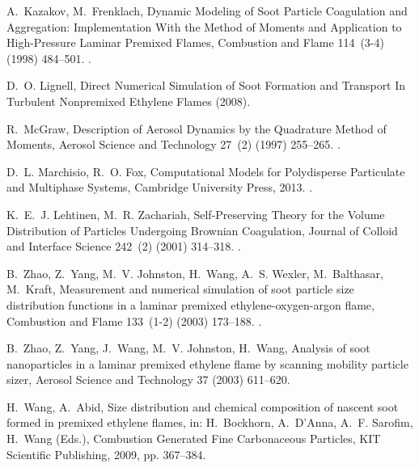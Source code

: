 \documentclass[preprint,letterpaper]{elsarticle}
\begin{document}
\begin{thebibliography}{00}
A.~Kazakov, M.~Frenklach, {Dynamic Modeling of Soot Particle Coagulation and
Aggregation: Implementation With the Method of Moments and Application to
High-Pressure Laminar Premixed Flames}, {Combustion and Flame} 114~(3-4)
(1998) 484--501.
\newblock \href {http://dx.doi.org/10.1016/S0010-2180(97)00322-2}
  {}.

D.~O. Lignell, {Direct Numerical Simulation of Soot Formation and Transport In
Turbulent Nonpremixed Ethylene Flames} (2008).

R.~McGraw, {Description of Aerosol Dynamics by the Quadrature Method of
Moments}, {Aerosol Science and Technology} 27~(2) (1997) 255--265.
\newblock \href {http://dx.doi.org/10.1080/02786829708965471}
  {}.

D.~L. Marchisio, R.~O. Fox, {Computational Models for Polydisperse Particulate
and Multiphase Systems}, {Cambridge University Press}, 2013.
\newblock \href {http://dx.doi.org/10.1017/CBO9781139016599}
  {}.

K.~E.~J. Lehtinen, M.~R. Zachariah, {Self-Preserving Theory for the Volume
Distribution of Particles Undergoing Brownian Coagulation}, {Journal of
Colloid and Interface Science} 242~(2) (2001) 314--318.
\newblock \href {http://dx.doi.org/10.1006/jcis.2001.7791}
  {}.

B.~Zhao, Z.~Yang, M.~V. Johnston, H.~Wang, A.~S. Wexler, M.~Balthasar,
M.~Kraft, {Measurement and numerical simulation of soot particle size
distribution functions in a laminar premixed ethylene-oxygen-argon flame},
{Combustion and Flame} 133~(1-2) (2003) 173--188.
\newblock \href {http://dx.doi.org/10.1016/S0010-2180(02)00574-6}
  {}.

B.~Zhao, Z.~Yang, J.~Wang, M.~V. Johnston, H.~Wang, {Analysis of soot
nanoparticles in a laminar premixed ethylene flame by scanning mobility
particle sizer}, {Aerosol Science and Technology} 37 (2003) 611--620.

H.~Wang, A.~Abid, {Size distribution and chemical composition of nascent soot
formed in premixed ethylene flames}, in: H.~Bockhorn, A.~D'Anna, A.~F.
Sarofim, H.~Wang (Eds.), {Combustion Generated Fine Carbonaceous Particles},
{KIT Scientific Publishing}, 2009, pp. 367--384.


\end{thebibliography}
\end{document}
